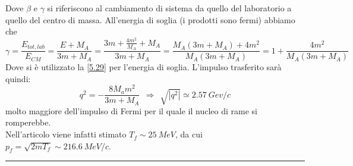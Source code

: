 \documentclass[twoside]{article}
\begin{document}
Dove $\beta$ e $\gamma$ si riferiscono al cambiamento di sistema da quello del laboratorio a quello del centro di massa. All'energia di soglia (i prodotti sono fermi) abbiamo che 
\begin{equation}
    \gamma=\frac{E_{tot,lab}}{E_{CM}}=\frac{E+M_A}{3m+M_A}=\frac{3m+\frac{4m^2}{M_A}+M_A}{3m+M_A}=\frac{M_A(3m+M_A)+4m^2}{M_A(3m+M_A)}=1+\frac{4m^2}{M_A(3m+M_A)}
\end{equation}
Dove si è utilizzato la \ref{5.29} per l'energia di soglia. L'impulso trasferito sarà quindi:
\begin{equation}
    q^2=-\frac{8M_am^2}{3m+M_A}\ \ \Rightarrow\ \ \sqrt{|q^2|}\simeq2.57\ Gev/c
\end{equation}
molto maggiore dell'impulso di Fermi per il quale il nucleo di rame si romperebbe.\\
Nell'articolo viene infatti stimato $T_f\sim 25 \ MeV$, da cui $p_f=\sqrt{2mT_f}\sim 216.6 \ MeV/c$.

\noindent\rule{\textwidth}{0.7pt}
\end{document}
